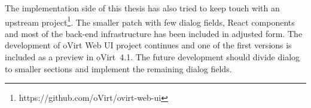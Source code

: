 The implementation side of this thesis has also tried to keep touch with an upstream project\footnote{https://github.com/oVirt/ovirt-web-ui}. The smaller patch with few dialog fields, React components and most of the back-end infrastructure has been included in adjusted form. The development of oVirt Web UI project continues and one of the first versions is included as a preview in oVirt~4.1. The future development should divide dialog to smaller sections and implement the remaining dialog fields.


 
